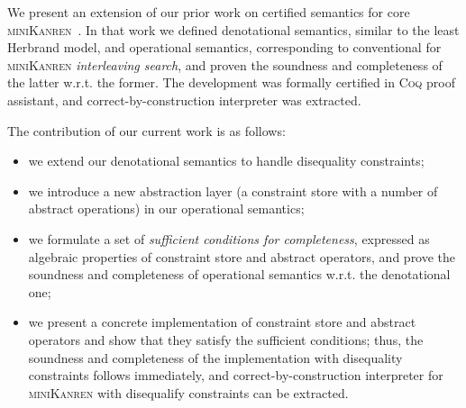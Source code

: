 \documentclass[submission,copyright,creativecommons]{eptcs}
\newcommand{\reprfun}{\mathfrak{f}}
\begin{document}

We present an extension of our prior work on certified semantics for core \textsc{miniKanren}~\cite{CertifiedSemantics}. In that work we
defined denotational semantics, similar to the least Herbrand model, and operational semantics, corresponding to conventional for \textsc{miniKanren}
\emph{interleaving search}, and proven the soundness and completeness of the latter w.r.t. the former. The development was formally certified in
\textsc{Coq} proof assistant, and correct-by-construction interpreter was extracted.

The contribution of our current work is as follows:

\begin{itemize}
\item we extend our denotational semantics to handle disequality constraints;
\item we introduce a new abstraction layer (a constraint store with a number of abstract operations) in our operational semantics;
\item we formulate a set of \emph{sufficient conditions for completeness}, expressed as algebraic properties of constraint store and
  abstract operators, and prove the soundness and completeness of operational semantics w.r.t. the denotational one;
\item we present a concrete implementation of constraint store and abstract operators and show that they satisfy the
  sufficient conditions; thus, the soundness and completeness of the implementation with disequality constraints follows
  immediately, and correct-by-construction interpreter for \textsc{miniKanren} with disequalify constraints
  can be extracted.
\end{itemize}

\end{document}
